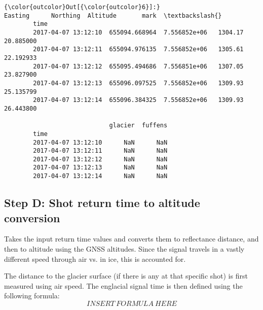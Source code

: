 \documentclass[11pt]{article}
\begin{document}
\begin{Verbatim}[commandchars=\\\{\}]
{\color{outcolor}Out[{\color{outcolor}6}]:}                            Easting      Northing  Altitude       mark  \textbackslash{}
        time                                                                    
        2017-04-07 13:12:10  655094.668964  7.556852e+06   1304.17  20.885000   
        2017-04-07 13:12:11  655094.976135  7.556852e+06   1305.61  22.192933   
        2017-04-07 13:12:12  655095.494686  7.556851e+06   1307.05  23.827900   
        2017-04-07 13:12:13  655096.097525  7.556852e+06   1309.93  25.135799   
        2017-04-07 13:12:14  655096.384325  7.556852e+06   1309.93  26.443800   
        
                             glacier  fuffens  
        time                                   
        2017-04-07 13:12:10      NaN      NaN  
        2017-04-07 13:12:11      NaN      NaN  
        2017-04-07 13:12:12      NaN      NaN  
        2017-04-07 13:12:13      NaN      NaN  
        2017-04-07 13:12:14      NaN      NaN  
\end{Verbatim}
            
    \subsection{Step D: Shot return time to altitude
conversion}\label{step-d-shot-return-time-to-altitude-conversion}

Takes the input return time values and converts them to reflectance
distance, and then to altitude using the GNSS altitudes. Since the
signal travels in a vastly different speed through air vs. in ice, this
is accounted for.

The distance to the glacier surface (if there is any at that specific
shot) is first measured using air speed. The englacial signal time is
then defined using the following formula: \[ INSERT\ FORMULA\ HERE\]
\end{document}
